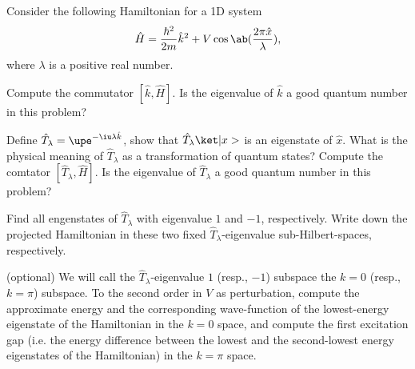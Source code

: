 \begin{problem}
  Consider the following Hamiltonian for a 1D system
  \[
    \hat H = \frac{\hbar^2}{2m}\hat k^2 + V\cos\ab(\frac{2\pi\hat x}\lambda),
  \]
  where $\lambda$ is a positive real number.
  \begin{enumext*}[label = (\alph*)]
    \item Compute the commutator $[\hat k, \hat H]$. Is the eigenvalue
    of $\hat k$ a good quantum number in this problem?
    \item Define $\hat T_\lambda = \upe^{-\iu\lambda\hat k}$, show that
    $\hat T_\lambda\ket|x>$ is an eigenstate of $\hat x$. What is the physical
    meaning of $\hat T_\lambda$ as a transformation of quantum states? Compute
    the comtator $[\hat T_\lambda, \hat H]$. Is the eigenvalue
    of $\hat T_\lambda$ a good quantum number in this problem?
    \item Find all engenstates of $\hat T_\lambda$ with eigenvalue $1$ and $-1$,
    respectively. Write down the projected Hamiltonian in these two
    fixed $\hat T_\lambda$-eigenvalue sub-Hilbert-spaces, respectively.
    \item* (optional) We will call the $\hat T_\lambda$-eigenvalue $1$
    (resp., $-1$) subspace the $k = 0$ (resp., $k = \pi$) subspace. To the
    second order in $V$ as perturbation, compute the approximate energy and the
    corresponding wave-function of the lowest-energy eigenstate of the
    Hamiltonian in the $k = 0$ space, and compute the first excitation gap
    (i.e. the energy difference between the lowest and the second-lowest energy
    eigenstates of the Hamiltonian) in the $k = \pi$ space.
  \end{enumext*}
\end{problem}

